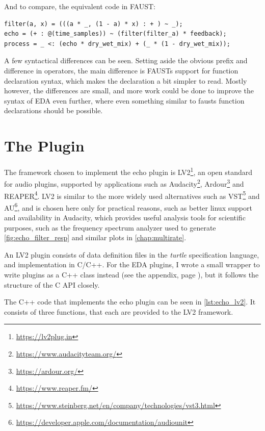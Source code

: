And to compare, the equivalent code in FAUST:

\begin{verbatim}
filter(a, x) = (((a * _, (1 - a) * x) : + ) ~ _);
echo = (+ : @(time_samples)) ~ (filter(filter_a) * feedback);
process = _ <: (echo * dry_wet_mix) + (_ * (1 - dry_wet_mix));
\end{verbatim}

A few syntactical differences can be seen. Setting aside the obvious  prefix and
difference in operators, the main difference is FAUSTs support for function declaration syntax, which makes
the  declaration a bit simpler to read. Mostly however, the differences are small, and
more work could be done to improve the syntax of EDA even further, where even something similar to fausts
function declarations should be possible.

\section{The Plugin}
\label{sec:echo_plugin}

The framework chosen to implement the echo plugin is LV2\footnote{\url{https://lv2plug.in}}, an open standard for audio
plugins, supported by applications such as Audacity\footnote{\url{https://www.audacityteam.org/}}, Ardour\footnote{\url{https://ardour.org/}} and
REAPER\footnote{\url{https://www.reaper.fm/}}. LV2 is similar to the more widely used alternatives such as
VST\footnote{\url{https://www.steinberg.net/en/company/technologies/vst3.html}} and AU\footnote{\url{https://developer.apple.com/documentation/audiounit}}, and is chosen here only for practical reasons, such
as better linux support and availability in Audacity, which provides useful analysis tools for scientific
purposes, such as the frequency spectrum analyzer used to generate \autoref{fig:echo_filter_resp} and similar plots
in \autoref{chap:multirate}.

An LV2 plugin consists of data definition files in the \emph{turtle} specification language, and
implementation in C/C++. For the EDA plugins, I wrote a small wrapper to write plugins as a C++ class instead
(see the appendix, page \pageref{codefile:example/lv2.hpp}), but it follows the structure of the C API closely.

The C++ code that implements the echo plugin can be seen in \autoref{lst:echo_lv2}. It consists of three
functions, that each are provided to the LV2 framework.

